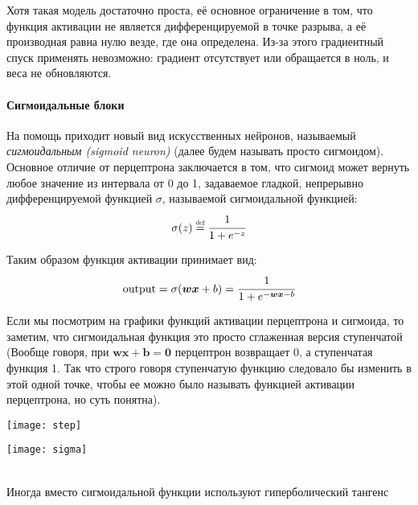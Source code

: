 Хотя такая модель достаточно проста, её основное ограничение в том, 
что функция активации не является дифференцируемой в точке разрыва, 
а её производная равна нулю везде, где она определена. 
Из-за этого градиентный спуск применять невозможно: градиент отсутствует или 
обращается в ноль, и веса не обновляются.

\paragraph{Сигмоидальные блоки}

На помощь приходит новый вид искусственных нейронов, называемый 
\textit{сигмоидальным (sigmoid neuron)} (далее будем называть просто сигмоидом). 
Основное отличие от перцептрона заключается в том, что
сигмоид может вернуть любое значение из интервала от 0 до 1, 
задаваемое гладкой, непрерывно дифференцируемой функцией $\sigma$, 
называемой сигмоидальной функцией:
\begin{equation*}
    \sigma(z) \defeq \cfrac{1}{1 + e^{-z}}
\end{equation*}

Таким образом функция активации принимает вид:
\begin{equation*}
    \text{output} = \sigma(\bm{wx} + b) = \cfrac{1}{1 + e^{-\bm{wx} - b}}
\end{equation*}

Если мы посмотрим на графики функций активации перцептрона и сигмоида, то 
заметим, что сигмоидальная функция это просто сглаженная версия ступенчатой 
(Вообще говоря, при $\bm{wx + b = 0}$ перцептрон возвращает 0, а ступенчатая 
функция 1. Так что строго говоря ступенчатую функцию следовало бы изменить в 
этой одной точке, чтобы ее можно было называть функцией активации перцептрона, но 
суть понятна).

\begin{minipage}{0.4\textwidth}
    \texttt{[image: step]}
    \label{fig:step}
\end{minipage}
\hspace{30pt}
\begin{minipage}{0.4\textwidth}
    \texttt{[image: sigma]}
    \label{fig:sigma}
\end{minipage}\\

Иногда вместо сигмоидальной функции используют гиперболический тангенс\\ 

